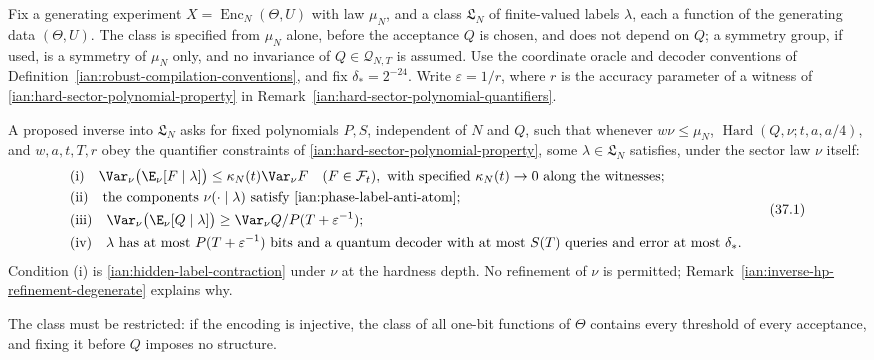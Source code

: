 \begin{definition}
\label{ian:inverse-hp-assertion}
Fix a generating experiment \(X=\operatorname{Enc}_N(\Theta,U)\) with law \(\mu_N\), and a class \(\mathfrak L_N\) of finite-valued labels \(\lambda\), each a function of the generating data \((\Theta,U)\). The class is specified from \(\mu_N\) alone, before the acceptance \(Q\) is chosen, and does not depend on \(Q\); a symmetry group, if used, is a symmetry of \(\mu_N\) only, and no invariance of \(Q\in\mathcal Q_{N,T}\) is assumed. Use the coordinate oracle and decoder conventions of Definition~\ref{ian:robust-compilation-conventions}, and fix \(\delta_*=2^{-24}\). Write \(\varepsilon=1/r\), where \(r\) is the accuracy parameter of a witness of \eqref{ian:hard-sector-polynomial-property} in Remark~\ref{ian:hard-sector-polynomial-quantifiers}.

A proposed inverse into \(\mathfrak L_N\) asks for fixed polynomials \(P,S\), independent of \(N\) and \(Q\), such that whenever \(w\nu\le\mu_N\), \(\operatorname{Hard}(Q,\nu;t,a,a/4)\), and \(w,a,t,T,r\) obey the quantifier constraints of \eqref{ian:hard-sector-polynomial-property}, some \(\lambda\in\mathfrak L_N\) satisfies, under the sector law \(\nu\) itself:
\[
 \begin{aligned}
 &\text{(i)}\quad \Var_\nu\bigl(\E_\nu[F\mid\lambda]\bigr)\le\kappa_N(t)\Var_\nu F\quad(F\in\mathcal F_t),\ \text{with specified }\kappa_N(t)\to0\text{ along the witnesses};\\
 &\text{(ii)}\quad \text{the components }\nu(\cdot\mid\lambda)\text{ satisfy \eqref{ian:phase-label-anti-atom}};\\
 &\text{(iii)}\quad \Var_\nu\bigl(\E_\nu[Q\mid\lambda]\bigr)\ge\Var_\nu Q/P(T+\varepsilon^{-1});\\
 &\text{(iv)}\quad \lambda\text{ has at most }P(T+\varepsilon^{-1})\text{ bits and a quantum decoder with at most }S(T)\text{ queries and error at most }\delta_* .
 \end{aligned}
 \tag{37.1}\label{ian:inverse-hp-requirements}
\]
Condition (i) is \eqref{ian:hidden-label-contraction} under \(\nu\) at the hardness depth. No refinement of \(\nu\) is permitted; Remark~\ref{ian:inverse-hp-refinement-degenerate} explains why.

The class must be restricted: if the encoding is injective, the class of all one-bit functions of \(\Theta\) contains every threshold of every acceptance, and fixing it before \(Q\) imposes no structure.
\end{definition}

